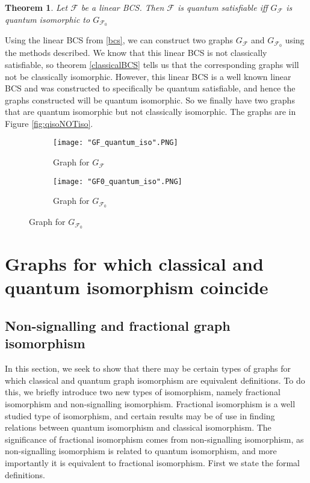 \documentclass[12pt]{article}
\newtheorem{thm}{Theorem}[section]
\begin{document}
\begin{thm}
\label{quantumBCS}
Let $\mathcal{F}$ be a linear BCS. Then $\mathcal{F}$ is quantum satisfiable iff $G_{\mathcal{F}}$ is quantum isomorphic to $G_{\mathcal{F}_0}$
\end{thm}

Using the linear BCS from \ref{bcs}, we can construct two graphs $G_{\mathcal{F}}$ and $G_{\mathcal{F}_0}$ using the methods described. We know that this linear BCS is not classically satisfiable, so theorem \ref{classicalBCS} tells us that the corresponding graphs will not be classically isomorphic. However, this linear BCS is a well known linear BCS and was constructed to specifically be quantum satisfiable, and hence the graphs constructed will be quantum isomorphic. So we finally have two graphs that are quantum isomorphic but not classically isomorphic. The graphs are in Figure \ref{fig:qisoNOTiso}. 

\begin{figure}
\label{fig:qisoNOTiso}
\centering
  \begin{subfigure}[b]{0.4\textwidth}
    \texttt{[image: "GF\_quantum\_iso".PNG]}
    \caption{Graph for $G_{\mathcal{F}}$}
  \end{subfigure}
  \begin{subfigure}[b]{0.4\textwidth}
    \texttt{[image: "GF0\_quantum\_iso".PNG]}
    \caption{Graph for $G_{\mathcal{F}_0}$}
  \end{subfigure}
\end{figure}



\section{Graphs for which classical and quantum isomorphism coincide}
\subsection{Non-signalling and fractional graph isomorphism}
In this section, we seek to show that there may be certain types of graphs for which classical and quantum graph isomorphism are equivalent definitions. To do this, we briefly introduce two new types of isomorphism, namely fractional isomorphism and non-signalling isomorphism. Fractional isomorphism is a well studied type of isomorphism, and certain results may be of use in finding relations between quantum isomorphism and classical isomorphism. The significance of fractional isomorphism comes from non-signalling isomorphism, as non-signalling isomorphism is related to quantum isomorphism, and more importantly it is equivalent to fractional isomorphism. First we state the formal definitions.
\end{document}
